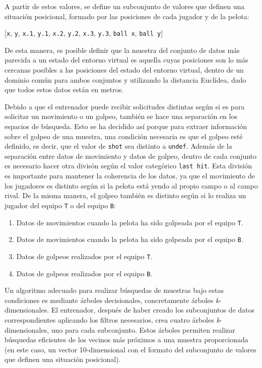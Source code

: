 A partir de estos valores, se define un subconjunto de valores que definen una situación posicional, formado por las posiciones de cada jugador y de la pelota:
\begin{center}
    [\texttt{x}, \texttt{y}, \texttt{x.1}, \texttt{y.1}, \texttt{x.2}, \texttt{y.2}, \texttt{x.3}, \texttt{y.3}, \texttt{ball x}, \texttt{ball y}]
\end{center}
De esta manera, es posible definir que la muestra del conjunto de datos más parecida a un estado del entorno virtual es aquella cuyas posiciones son lo más cercanas posibles a las posiciones del estado del entorno virtual, dentro de un dominio común para ambos conjuntos y utilizando la distancia Euclídea, dado que todos estos datos están en metros.

Debido a que el entrenador puede recibir solicitudes distintas según si es para solicitar un movimiento o un golpeo, también se hace una separación en los espacios de búsqueda. Esto se ha decidido así porque para extraer información sobre el golpeo de una muestra, una condición necesaria es que el golpeo esté definido, es decir, que el valor de \texttt{shot} sea distinto a \texttt{undef}. Además de la separación entre datos de movimiento y datos de golpeo, dentro de cada conjunto es necesario hacer otra divisón según el valor categórico \texttt{last hit}. Esta división es importante para mantener la coherencia de los datos, ya que el movimiento de los jugadores es distinto según si la pelota está yendo al propio campo o al campo rival. De la misma manera, el golpeo también es distinto según si lo realiza un jugador del equipo \texttt{T} o del equipo \texttt{B}:
\begin{enumerate}
    \item Datos de movimientos cuando la pelota ha sido golpeada por el equipo \texttt{T}.
    \item Datos de movimientos cuando la pelota ha sido golpeada por el equipo \texttt{B}.
    \item Datos de golpeos realizados por el equipo \texttt{T}.
    \item Datos de golpeos realizados por el equipo \texttt{B}.
\end{enumerate}

Un algoritmo adecuado para realizar búsquedas de muestras bajo estas condiciones es mediante árboles decisionales, concretamente árboles \emph{k}-dimensionales. El entrenador, después de haber creado los subconjuntos de datos correspondientes aplicando los filtros necesarios, crea cuatro árboles \emph{k}-dimensionales, uno para cada subconjunto. Estos árboles permiten realizar búsquedas eficientes de los vecinos más próximos a una muestra proporcionada (en este caso, un vector 10-dimensional con el formato del subconjunto de valores que definen una
situación posicional).

